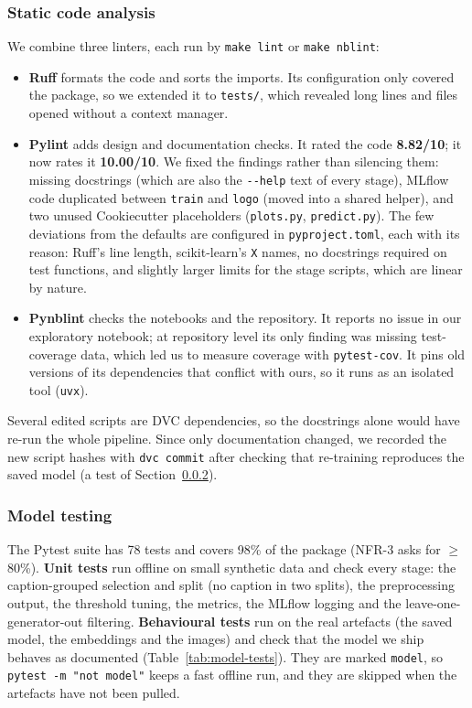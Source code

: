 \documentclass[11pt]{article}
\begin{document}
\subsubsection{Static code analysis}
\label{sec:static-analysis}
We combine three linters, each run by \texttt{make lint} or \texttt{make nblint}:
\begin{itemize}[nosep,leftmargin=1.4em]
  \item \textbf{Ruff} formats the code and sorts the imports. Its configuration only covered the package, so we extended it to \texttt{tests/}, which revealed long lines and files opened without a context manager.
  \item \textbf{Pylint} adds design and documentation checks. It rated the code \textbf{8.82/10}; it now rates it \textbf{10.00/10}. We fixed the findings rather than silencing them: missing docstrings (which are also the \texttt{-{}-help} text of every stage), MLflow code duplicated between \texttt{train} and \texttt{logo} (moved into a shared helper), and two unused Cookiecutter placeholders (\texttt{plots.py}, \texttt{predict.py}). The few deviations from the defaults are configured in \texttt{pyproject.toml}, each with its reason: Ruff's line length, scikit-learn's \texttt{X} names, no docstrings required on test functions, and slightly larger limits for the stage scripts, which are linear by nature.
  \item \textbf{Pynblint} checks the notebooks and the repository. It reports no issue in our exploratory notebook; at repository level its only finding was missing test-coverage data, which led us to measure coverage with \texttt{pytest-cov}. It pins old versions of its dependencies that conflict with ours, so it runs as an isolated tool (\texttt{uvx}).
\end{itemize}
Several edited scripts are DVC dependencies, so the docstrings alone would have re-run the whole pipeline. Since only documentation changed, we recorded the new script hashes with \texttt{dvc commit} after checking that re-training reproduces the saved model (a test of Section~\ref{sec:model-testing}).

\subsubsection{Model testing}
\label{sec:model-testing}
The Pytest suite has 78 tests and covers 98\% of the package (NFR-3 asks for $\geq$ 80\%). \textbf{Unit tests} run offline on small synthetic data and check every stage: the caption-grouped selection and split (no caption in two splits), the preprocessing output, the threshold tuning, the metrics, the MLflow logging and the leave-one-generator-out filtering. \textbf{Behavioural tests} run on the real artefacts (the saved model, the embeddings and the images) and check that the model we ship behaves as documented (Table~\ref{tab:model-tests}). They are marked \texttt{model}, so \texttt{pytest -m "not model"} keeps a fast offline run, and they are skipped when the artefacts have not been pulled.
\end{document}
